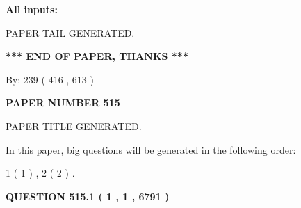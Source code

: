 \documentclass[12pt]{article}
\begin{document}
   
   
   
\noindent{}
   
   
   
   
\noindent\vspace{0.1in}\hspace{-0.08in} {\textbf{\Large{All inputs: }}}
   
   
   
   
   
   
 \vspace{0.2in}
 
   
   
\vspace{2.0in} PAPER TAIL GENERATED.
   
   
   
   
\vspace{1.0in} 
{\textbf{\large{ *** END OF PAPER, THANKS *** }}} 
   
   
\hspace{1.0in} By: 
 239 ( 416 ,  613 )
   
   
   
   
\newpage 
\setcounter{page}{ 
   515001 } 
   
   
   
   
 {\textbf{ \Large{ PAPER NUMBER  515  }}}
   
   
\vspace{0.2in}
   
   
   
   
   
   
   
   
 \vspace{0.2in}
 
 
 
 
   
   
 PAPER TITLE GENERATED.
   
   
   
\vspace{0.2in}
   
In this paper, big questions will be generated in the following order: 
   
   
   1 ( 1 )
 ,
   2 ( 2 )
 .
  
\vspace{0.2in}
  
{\textbf{\Large{QUESTION
515.1 
 ( 1 , 1 , 6791 )
}}}
  
\end{document}
